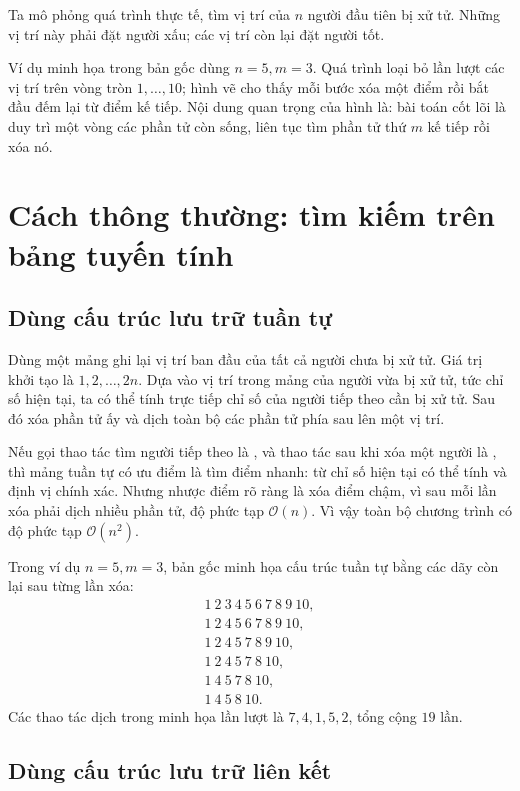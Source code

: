\documentclass[11pt]{article}
\newcommand{\Oh}{\mathcal{O}}
\begin{document}
Ta mô phỏng quá trình thực tế, tìm vị trí của \(n\) người đầu tiên bị xử tử.
Những vị trí này phải đặt người xấu; các vị trí còn lại đặt người tốt.

Ví dụ minh họa trong bản gốc dùng \(n=5,m=3\). Quá trình loại bỏ lần lượt các
vị trí trên vòng tròn \(1,\ldots,10\); hình vẽ cho thấy mỗi bước xóa một điểm
rồi bắt đầu đếm lại từ điểm kế tiếp. Nội dung quan trọng của hình là: bài toán
cốt lõi là duy trì một vòng các phần tử còn sống, liên tục tìm phần tử thứ
\(m\) kế tiếp rồi xóa nó.

\section{Cách thông thường: tìm kiếm trên bảng tuyến tính}

\subsection{Dùng cấu trúc lưu trữ tuần tự}

Dùng một mảng ghi lại vị trí ban đầu của tất cả người chưa bị xử tử. Giá trị
khởi tạo là \(1,2,\ldots,2n\). Dựa vào vị trí trong mảng của người vừa bị xử
tử, tức chỉ số hiện tại, ta có thể tính trực tiếp chỉ số của người tiếp theo
cần bị xử tử. Sau đó xóa phần tử ấy và dịch toàn bộ các phần tử phía sau lên
một vị trí.

Nếu gọi thao tác tìm người tiếp theo là , và thao tác sau khi
xóa một người là , thì mảng tuần tự có ưu điểm là tìm điểm
nhanh: từ chỉ số hiện tại có thể tính và định vị chính xác. Nhưng nhược điểm
rõ ràng là xóa điểm chậm, vì sau mỗi lần xóa phải dịch nhiều phần tử, độ phức
tạp \(\Oh(n)\). Vì vậy toàn bộ chương trình có độ phức tạp \(\Oh(n^2)\).

Trong ví dụ \(n=5,m=3\), bản gốc minh họa cấu trúc tuần tự bằng các dãy còn
lại sau từng lần xóa:
\[
\begin{array}{l}
1\ 2\ 3\ 4\ 5\ 6\ 7\ 8\ 9\ 10,\\
1\ 2\ 4\ 5\ 6\ 7\ 8\ 9\ 10,\\
1\ 2\ 4\ 5\ 7\ 8\ 9\ 10,\\
1\ 2\ 4\ 5\ 7\ 8\ 10,\\
1\ 4\ 5\ 7\ 8\ 10,\\
1\ 4\ 5\ 8\ 10.
\end{array}
\]
Các thao tác dịch trong minh họa lần lượt là \(7,4,1,5,2\), tổng cộng \(19\)
lần.

\subsection{Dùng cấu trúc lưu trữ liên kết}
\end{document}
